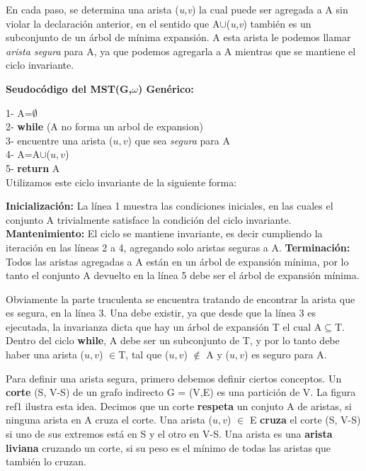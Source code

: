 \documentclass[a4paper, 11pt]{report}
\begin{document}
En cada paso, se determina una arista (\textit{u,v}) la cual puede ser agregada a A sin violar la declaración anterior, en el sentido que A$\cup${(\textit{u,v})} también es un subconjunto de un árbol de mínima expansión. A esta arista le podemos llamar \textit{arista segura} para A, ya que podemos agregarla a A mientras que se mantiene el ciclo invariante.

\textbf{Seudocódigo del MST(G,$ \omega$) Genérico: }

1- A=$ \emptyset$\\
2- \textbf{while} (A no forma un arbol de expansion)\\
3- 	\indent	encuentre una arista ($u,v$) que sea \textit{segura} para A\\ 4- 	\indent	A=A$\cup${($u,v$)}\\
5- \textbf{return} A\\

Utilizamos este ciclo invariante de la siguiente forma:

\textbf{Inicialización:} La línea 1 muestra las condiciones iniciales, en las cuales el conjunto A trivialmente satisface la condición del ciclo invariante.  
\textbf{Mantenimiento:} El ciclo se mantiene invariante, es decir cumpliendo la iteración en las líneas 2 a 4, agregando solo aristas seguras a A.
\textbf{Terminación:} Todos las aristas agregadas a A están en un árbol de expansión mínima, por lo tanto el conjunto A devuelto en la línea 5 debe ser el árbol de expansión mínima.

Obviamente la parte truculenta se encuentra tratando de encontrar la arista que es segura, en la línea 3. Una debe existir, ya que desde que la línea 3 es ejecutada, la invarianza dicta que hay un árbol de expansión T el cual A$ \subseteq $T. Dentro del ciclo \textbf{while}, A debe ser un subconjunto de T, y por lo tanto debe haber una arista ($u,v$) $ \in $T, tal que ($u, v$) $\notin$ A y ($u, v$) es seguro para A.

Para definir una arista segura, primero debemos definir ciertos conceptos. Un \textbf{corte} (S, V-S) de un grafo indirecto G = (V,E) es una partición de V. La figura ref1 ilustra esta idea. Decimos que un corte \textbf{respeta} un conjuto A de aristas, si ninguna arista en A cruza el corte. Una arista ($u,v$) $\in$ E \textbf{cruza} el corte (S, V-S) si uno de sus extremos está en S y el otro en V-S. Una arista es una \textbf{arista liviana} cruzando un corte, si su peso es el mínimo de todas las aristas que también lo cruzan.
\end{document}
